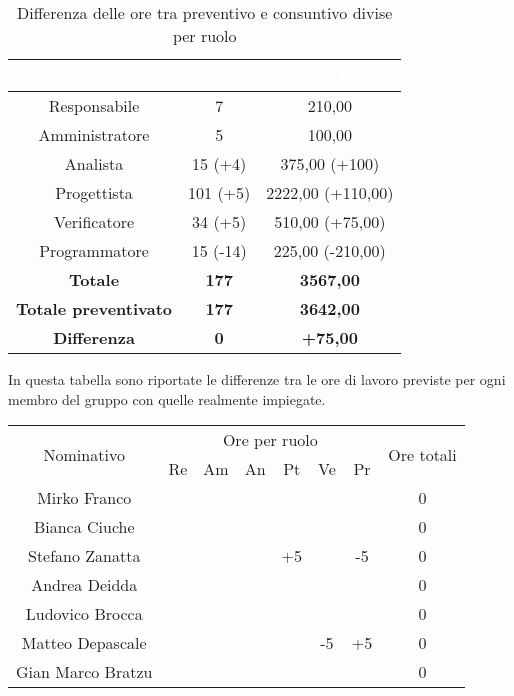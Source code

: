 \begin{flushleft}
	\begin{table}[!h]
	\begin{center}
		\begin{tabular}{ccc}
			\rowcolor{coolblack}
			\hline
			\textcolor{white}{Ruolo} & \textcolor{white}{Ore} & \textcolor{white}{Costo in \euro}\\
			\hline
			Responsabile   & 7   		&  210,00  			 	\\ 
			Amministratore & 5   		&  100,00 			 	\\ 
			Analista       & 15 (+4)	  	&  375,00 (+100)   	\\ 
			Progettista    & 101 (+5)	&  2222,00 (+110,00) 	\\ 
			Verificatore   & 34 (+5)  	&  510,00 (+75,00) 		\\ 
			Programmatore  & 15 (-14)   &  225,00 (-210,00) 	\\ \hline
			\textbf{Totale}& \textbf{177} & \textbf{3567,00}	\\ \hline 
			\textbf{Totale preventivato}& \textbf{177} & \textbf{3642,00}\\ \hline 
			\textbf{Differenza}& \textbf{0} & \textbf{+75,00 }	\\ \hline  
		\end{tabular}
		
		\caption{Differenza delle ore tra preventivo e consuntivo divise per ruolo} 
	\end{center}
\end{table}
  \clearpage
  
  In questa tabella  sono riportate le differenze tra le ore di lavoro previste per ogni membro del gruppo con quelle realmente impiegate.\\
  
    \begin{table}[!h]
  	\begin{center}
    \begin{tabularx}{\textwidth}{|c|cccccc|c|}
  			
  	\hline
  	\multirow{2}{*}{Nominativo} & \multicolumn{6}{c|}{Ore per ruolo} & \multirow{2}{*}{Ore totali} \\ \cline{2-7}
  					  & Re & Am & An & Pt & Ve & Pr &      \\ \hline
  	\endhead
  	Mirko Franco       &   &    &    &    &  &   & 0        \\ \hline
  	Bianca Ciuche      &   &    &    &    &  &   & 0        \\ \hline
  	Stefano Zanatta    &   &    &  & +5 &   & -5  & 0        \\ \hline
  	Andrea Deidda      &   &  &   &   &   &   & 0  		\\ \hline
  	Ludovico Brocca    &   &  &   &   &  &   & 0        \\ \hline
  	Matteo Depascale   &   &  &   &   & -5  & +5  & 0  		\\ \hline
  	Gian Marco Bratzu  &   &  &   &   &  &   & 0        \\ \hline
    

\end{tabularx}
\end{center}
\end{table}
\end{flushleft}

